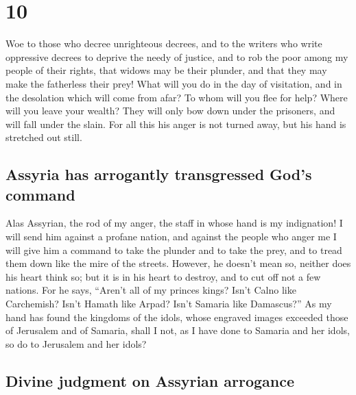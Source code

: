 \hypertarget{section-9}{%
\section{10}\label{section-9}}

 Woe to those who decree unrighteous decrees, and to the
writers who write oppressive decrees  to deprive the needy
of justice, and to rob the poor among my people of their rights, that
widows may be their plunder, and that they may make the fatherless their
prey!  What will you do in the day of visitation, and in
the desolation which will come from afar? To whom will you flee for
help? Where will you leave your wealth?  They will only
bow down under the prisoners, and will fall under the slain. For all
this his anger is not turned away, but his hand is stretched out still.

\hypertarget{assyria-has-arrogantly-transgressed-gods-command}{%
\subsection{Assyria has arrogantly transgressed God's
command}\label{assyria-has-arrogantly-transgressed-gods-command}}

 Alas Assyrian, the rod of my anger, the staff in whose
hand is my indignation!  I will send him against a profane
nation, and against the people who anger me I will give him a command to
take the plunder and to take the prey, and to tread them down like the
mire of the streets.  However, he doesn't mean so, neither
does his heart think so; but it is in his heart to destroy, and to cut
off not a few nations.  For he says, ``Aren't all of my
princes kings?  Isn't Calno like Carchemish? Isn't Hamath
like Arpad? Isn't Samaria like Damascus?''  As my hand
has found the kingdoms of the idols, whose engraved images exceeded
those of Jerusalem and of Samaria,  shall I not, as I
have done to Samaria and her idols, so do to Jerusalem and her idols?

\hypertarget{divine-judgment-on-assyrian-arrogance}{%
\subsection{Divine judgment on Assyrian
arrogance}\label{divine-judgment-on-assyrian-arrogance}}

